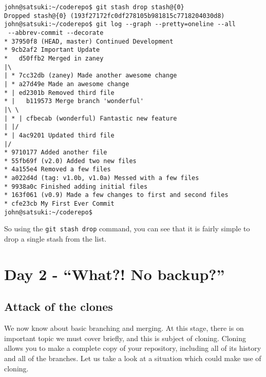 \begin{Verbatim}
john@satsuki:~/coderepo$ git stash drop stash@{0}
Dropped stash@{0} (193f27172fc0df278105b981815c7718204030d8)
john@satsuki:~/coderepo$ git log --graph --pretty=oneline --all 
 --abbrev-commit --decorate
* 37950f8 (HEAD, master) Continued Development
* 9cb2af2 Important Update
*   d50ffb2 Merged in zaney
|\  
| * 7cc32db (zaney) Made another awesome change
| * a27d49e Made an awesome change
* | ed2301b Removed third file
* |   b119573 Merge branch 'wonderful'
|\ \  
| * | cfbecab (wonderful) Fantastic new feature
| |/  
* | 4ac9201 Updated third file
|/  
* 9710177 Added another file
* 55fb69f (v2.0) Added two new files
* 4a155e4 Removed a few files
* a022d4d (tag: v1.0b, v1.0a) Messed with a few files
* 9938a0c Finished adding initial files
* 163f061 (v0.9) Made a few changes to first and second files
* cfe23cb My First Ever Commit
john@satsuki:~/coderepo$ 
\end{Verbatim}

So using the \texttt{git stash drop} command, you can see that it is fairly simple to drop a single stash from the list.


\section{Day 2 - ``What?! No backup?''}
\subsection{Attack of the clones}

We now know about basic branching and merging.  At this stage, there is on important topic we must cover briefly, and this is subject of cloning.  Cloning allows you to make a complete copy of your repository, including all of its history and all of the branches.  Let us take a look at a situation which could make use of cloning.

